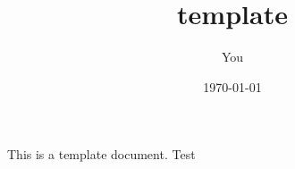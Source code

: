 \documentclass[12pt]{article}
\author{You}
\date{\today}
\title{template}
\begin{document}
This is a template document. Test
\end{document}
